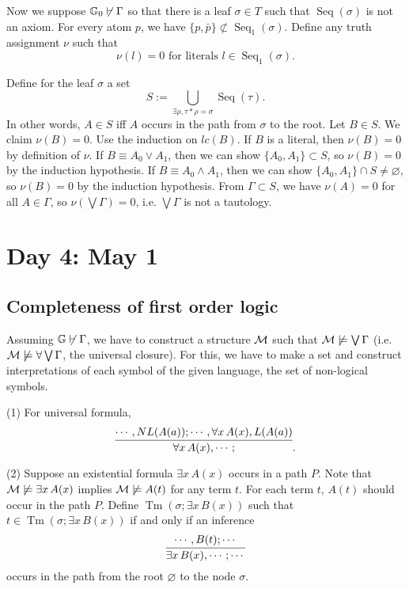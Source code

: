 \documentclass{../../small}
\DeclareMathOperator{\Tm}{Tm}
\DeclareMathOperator{\Seq}{Seq}
\begin{document}
\begin{pf}
Now we suppose $\mathbb{G}_0\not\vdash\Gamma$ so that there is a leaf $\sigma\in T$ such that $\Seq(\sigma)$ is not an axiom.
For every atom $p$, we have $\{p,\bar p\}\not\subset\Seq_1(\sigma)$.
Define any truth assignment $\nu$ such that
\[\nu(l)=0\text{ for literals }l\in\Seq_1(\sigma).\]

Define for the leaf $\sigma$ a set
\[S:=\bigcup_{\exists\rho,\tau*\rho=\sigma}\Seq(\tau).\]
In other words, $A\in S$ iff $A$ occurs in the path from $\sigma$ to the root.
Let $B\in S$.
We claim $\nu(B)=0$.
Use the induction on $lc(B)$.
If $B$ is a literal, then $\nu(B)=0$ by definition of $\nu$.
If $B\equiv A_0\vee A_1$, then we can show $\{A_0,A_1\}\subset S$, so $\nu(B)=0$ by the induction hypothesis.
If $B\equiv A_0\wedge A_1$, then we can show $\{A_0,A_1\}\cap S\ne\varnothing$, so $\nu(B)=0$ by the induction hypothesis.
From $\Gamma\subset S$, we have $\nu(A)=0$ for all $A\in\Gamma$, so $\nu(\bigvee\Gamma)=0$, i.e. $\bigvee\Gamma$ is not a tautology.
\end{pf}



\newpage
\section{Day 4: May 1}
\subsection*{Completeness of first order logic}

Assuming $\mathbb{G}\not\vdash\Gamma$, we have to construct a structure $\mathcal{M}$ such that $\mathcal{M}\not\models\bigvee\Gamma$ (i.e.$\mathcal{M}\not\models\forall\bigvee\Gamma$, the universal closure).
For this, we have to make a set and construct interpretations of each symbol of the given language, the set of non-logical symbols.

(1)
For universal formula,
\[\infer{\forall x\,A(x),\cdots;}{\cdots, NL(A(a));\cdots,\forall x\,A(x),L(A(a))}.\]

(2)
Suppose an existential formula $\exists x\,A(x)$ occurs in a path $P$.
Note that $\mathcal{M}\not\models \exists x\,A(x)$ implies $\mathcal{M}\not\models A(t)$ for any term $t$.
For each term $t$, $A(t)$ should occur in the path $P$.
Define $\Tm(\sigma;\exists x\,B(x))$ such that $t\in\Tm(\sigma;\exists x\,B(x))$ if and only if an inference
\[\infer{\exists x\,B(x),\cdots;\cdots}{\cdots,B(t);\cdots}\]
occurs in the path from the root $\varnothing$ to the node $\sigma$.
\end{document}

